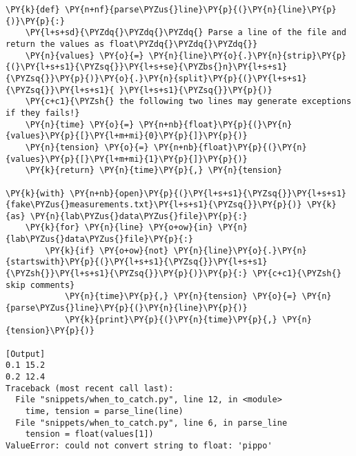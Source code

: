 \begin{Verbatim}[label=\makebox{\url{https://github.com/lucabaldini/cmepda/tree/master/slides/latex/snippets/when\_to\_catch.py}},commandchars=\\\{\}]
\PY{k}{def} \PY{n+nf}{parse\PYZus{}line}\PY{p}{(}\PY{n}{line}\PY{p}{)}\PY{p}{:}
    \PY{l+s+sd}{\PYZdq{}\PYZdq{}\PYZdq{} Parse a line of the file and return the values as float\PYZdq{}\PYZdq{}\PYZdq{}}
    \PY{n}{values} \PY{o}{=} \PY{n}{line}\PY{o}{.}\PY{n}{strip}\PY{p}{(}\PY{l+s+s1}{\PYZsq{}}\PY{l+s+se}{\PYZbs{}n}\PY{l+s+s1}{\PYZsq{}}\PY{p}{)}\PY{o}{.}\PY{n}{split}\PY{p}{(}\PY{l+s+s1}{\PYZsq{}}\PY{l+s+s1}{ }\PY{l+s+s1}{\PYZsq{}}\PY{p}{)}
    \PY{c+c1}{\PYZsh{} the following two lines may generate exceptions if they fails!}
    \PY{n}{time} \PY{o}{=} \PY{n+nb}{float}\PY{p}{(}\PY{n}{values}\PY{p}{[}\PY{l+m+mi}{0}\PY{p}{]}\PY{p}{)}
    \PY{n}{tension} \PY{o}{=} \PY{n+nb}{float}\PY{p}{(}\PY{n}{values}\PY{p}{[}\PY{l+m+mi}{1}\PY{p}{]}\PY{p}{)}
    \PY{k}{return} \PY{n}{time}\PY{p}{,} \PY{n}{tension}

\PY{k}{with} \PY{n+nb}{open}\PY{p}{(}\PY{l+s+s1}{\PYZsq{}}\PY{l+s+s1}{fake\PYZus{}measurements.txt}\PY{l+s+s1}{\PYZsq{}}\PY{p}{)} \PY{k}{as} \PY{n}{lab\PYZus{}data\PYZus{}file}\PY{p}{:}
    \PY{k}{for} \PY{n}{line} \PY{o+ow}{in} \PY{n}{lab\PYZus{}data\PYZus{}file}\PY{p}{:}
        \PY{k}{if} \PY{o+ow}{not} \PY{n}{line}\PY{o}{.}\PY{n}{startswith}\PY{p}{(}\PY{l+s+s1}{\PYZsq{}}\PY{l+s+s1}{\PYZsh{}}\PY{l+s+s1}{\PYZsq{}}\PY{p}{)}\PY{p}{:} \PY{c+c1}{\PYZsh{} skip comments}
            \PY{n}{time}\PY{p}{,} \PY{n}{tension} \PY{o}{=} \PY{n}{parse\PYZus{}line}\PY{p}{(}\PY{n}{line}\PY{p}{)}
            \PY{k}{print}\PY{p}{(}\PY{n}{time}\PY{p}{,} \PY{n}{tension}\PY{p}{)}

[Output]
0.1 15.2
0.2 12.4
Traceback (most recent call last):
  File "snippets/when_to_catch.py", line 12, in <module>
    time, tension = parse_line(line)
  File "snippets/when_to_catch.py", line 6, in parse_line
    tension = float(values[1])
ValueError: could not convert string to float: 'pippo'
\end{Verbatim}